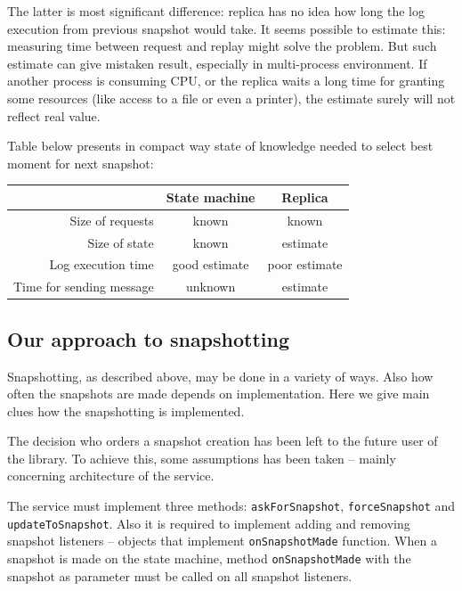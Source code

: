 The latter is most significant difference: replica has no idea how long the log execution from previous snapshot would take. It seems possible to estimate this: measuring time between request and replay might solve the problem. But such estimate can give mistaken result, especially in multi-process environment. If another process is consuming CPU, or the replica waits a long time for granting some resources (like access to a file or even a printer), the estimate surely will not reflect real value.

Table below presents in compact way state of knowledge needed to select best moment for next snapshot:
\begin{center}
\small
\begin{tabular}{r|c|c|}
\cline{2-3}
 & State machine & Replica \\ \hline 
\multicolumn{1}{|r|}{Size of requests} & known & known \\ \hline
\multicolumn{1}{|r|}{Size of state } & known & estimate \\ \hline
\multicolumn{1}{|r|}{Log execution time} & good estimate & poor estimate \\ \hline
\multicolumn{1}{|r|}{Time for sending message} & unknown & estimate \\ \hline
\end{tabular}
\end{center}

\subsection{Our approach to snapshotting}
\label{subsec:our_approach_to_snapshotting}
Snapshotting, as described above, may be done in a variety of ways. Also how often the snapshots are made depends on implementation. Here we give main clues how the snapshotting is implemented.

The decision who orders a snapshot creation has been left to the future user of the library. To achieve this, some assumptions has been taken -- mainly
concerning architecture of the service.

The service must implement three methods: \texttt{askForSnapshot}, \texttt{forceSnapshot} and \texttt{up\-date\-To\-Snap\-shot}. Also it is required to implement adding and removing snapshot listeners -- objects that implement \texttt{onSnapshotMade} function. When a snapshot is made on the state machine, method \texttt{onSnapshotMade} with the snapshot as parameter must be called on all snapshot listeners.

